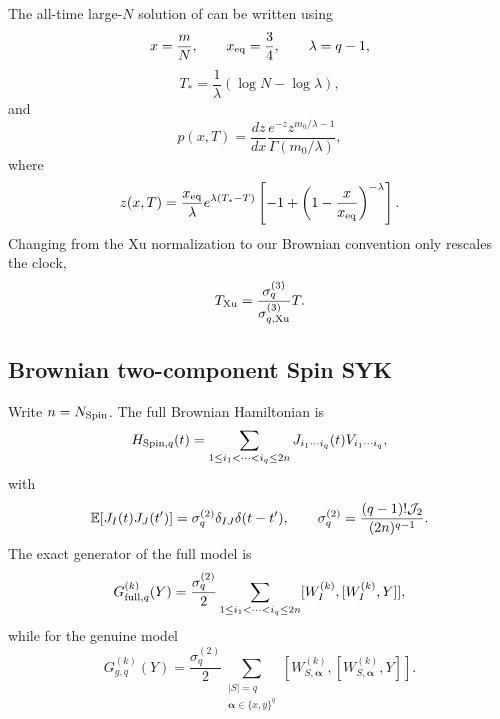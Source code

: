 \documentclass{article}
\theoremstyle{definition}
\begin{document}
The all-time large-$N$ solution of \cite{XuBrownianSpin} can be written
using
\begin{equation}
    x=\frac mN,
    \qquad
    x_{\rm eq}=\frac34,
    \qquad
    \lambda=q-1,
\end{equation}
\begin{equation}
    T_*
    =\frac1\lambda(\log N-\log\lambda),
\end{equation}
and
\begin{equation}
    p(x,T)
    =\frac{dz}{dx}
      \frac{e^{-z}z^{m_0/\lambda-1}}
           {\Gamma(m_0/\lambda)},
\end{equation}
where
\begin{equation}
    z(x,T)
    =\frac{x_{\rm eq}}{\lambda}
     e^{\lambda(T_*-T)}
     \left[
       -1+\left(1-\frac{x}{x_{\rm eq}}\right)^{-\lambda}
     \right].
\end{equation}
Changing from the Xu normalization to our Brownian convention only rescales
the clock,
\begin{equation}
    T_{\rm Xu}
    =\frac{\sigma_q^{(3)}}{\sigma_{q,{\rm Xu}}^{(3)}}T.
\end{equation}

\subsection{Brownian two-component Spin SYK}

Write $n=N_{\rm Spin}$.  The full Brownian Hamiltonian is
\begin{equation}
    H_{{\rm Spin},q}(t)
    =\sum_{1\le i_1<\cdots<i_q\le2n}
    J_{i_1\cdots i_q}(t)V_{i_1\cdots i_q},
\end{equation}
with
\begin{equation}
    \mathbb E[J_I(t)J_J(t')]
    =\sigma_q^{(2)}\delta_{IJ}\delta(t-t'),
    \qquad
    \sigma_q^{(2)}
    =\frac{(q-1)!{\cal J}_2}{(2n)^{q-1}}.
\end{equation}
The exact generator of the full model is
\begin{equation}
    G_{{\rm full},q}^{(k)}(Y)
    =\frac{\sigma_q^{(2)}}2
      \sum_{1\le i_1<\cdots<i_q\le2n}
      [W_I^{(k)},[W_I^{(k)},Y]],
\end{equation}
while for the genuine model
\begin{equation}
    G_{g,q}^{(k)}(Y)
    =\frac{\sigma_q^{(2)}}2
      \sum_{\substack{|S|=q\\
                      \boldsymbol\alpha\in\{x,y\}^q}}
      [W_{S,\boldsymbol\alpha}^{(k)},
       [W_{S,\boldsymbol\alpha}^{(k)},Y]].
\end{equation}
\end{document}
